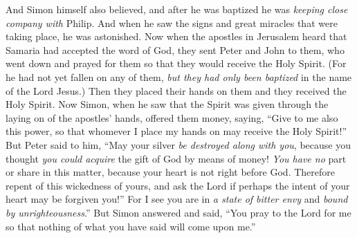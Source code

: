 \begin{biblechapter}
\verse And Simon himself also believed, and after he was baptized he was \textit{keeping close company with} Philip. And when he saw the signs and great miracles that were taking place, he was astonished.
\verse Now when the apostles in Jerusalem heard that Samaria had accepted the word of God, they sent Peter and John to them,
\verse who went down and prayed for them so that they would receive the Holy Spirit.
\verse (For he had not yet fallen on any of them, \textit{but they had only been baptized} in the name of the Lord Jesus.)
\verse Then they placed their hands on them and they received the Holy Spirit.
\verse Now Simon, when he saw that the Spirit was given through the laying on of the apostles’ hands, offered them money,
\verse saying, “Give to me also this power, so that whomever I place my hands on may receive the Holy Spirit!”
\verse But Peter said to him, “May your silver \textit{be destroyed along with you}, because you thought \textit{you could acquire} the gift of God by means of money!
\verse \textit{You have no} part or share in this matter, because your heart is not right before God.
\verse Therefore repent of this wickedness of yours, and ask the Lord if perhaps the intent of your heart may be forgiven you!”
\verse For I see you are in \textit{a state of bitter envy} and \textit{bound by unrighteousness}.”
\verse But Simon answered and said, “You pray to the Lord for me so that nothing of what you have said will come upon me.”

\end{biblechapter}
